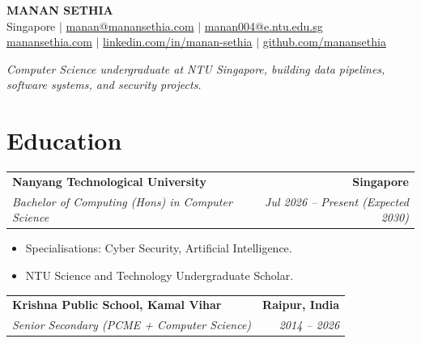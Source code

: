 \documentclass[10pt,a4paper]{article}
\makeatletter
\newcommand{\resumeItem}[1]{
  \item\small{#1}
}
\newcommand{\resumeSubheading}[4]{
  \vspace{3pt}
  \begin{tabular*}{\textwidth}[t]{l@{\extracolsep{\fill}}r}
    \textbf{#1} & \textbf{\small #2} \\
    \textit{\small#3} & \textit{\small #4} \\
  \end{tabular*}\vspace{0pt}
}
\makeatother
\begin{document}
\begin{center}
    {\Huge \textbf{MANAN SETHIA}} \\[5pt]
    \small
    Singapore \enspace$\vert$\enspace
    \href{mailto:manan@manansethia.com}{manan@manansethia.com} \enspace$\vert$\enspace
    \href{mailto:manan004@e.ntu.edu.sg}{manan004@e.ntu.edu.sg} \\[2pt]
    \href{https://manansethia.com}{manansethia.com} \enspace$\vert$\enspace
    \href{https://linkedin.com/in/manan-sethia}{linkedin.com/in/manan-sethia} \enspace$\vert$\enspace
    \href{https://github.com/manansethia}{github.com/manansethia}
\end{center}

\vspace{-2pt}
\begin{center}
    \small \textit{Computer Science undergraduate at NTU Singapore, building data pipelines, software systems, and security projects.}
\end{center}
\vspace{-2pt}

\section{Education}
  \resumeSubheading
    {Nanyang Technological University}{Singapore}
    {Bachelor of Computing (Hons) in Computer Science}{Jul 2026 -- Present (Expected 2030)}
    \begin{itemize}
      \resumeItem{Specialisations: Cyber Security, Artificial Intelligence.}
      \resumeItem{NTU Science and Technology Undergraduate Scholar.}
    \end{itemize}

  \resumeSubheading
    {Krishna Public School, Kamal Vihar}{Raipur, India}
    {Senior Secondary (PCME + Computer Science)}{2014 -- 2026}

\end{document}
